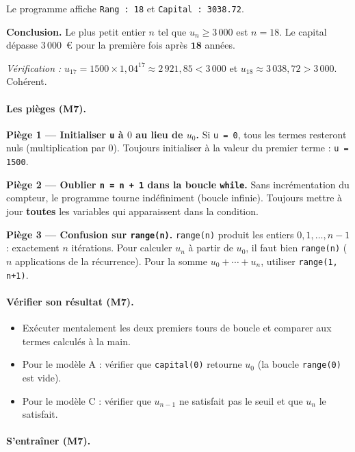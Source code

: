 

Le programme affiche \texttt{Rang : 18} et \texttt{Capital : 3038.72}.

\textbf{Conclusion.} Le plus petit entier $n$ tel que $u_n \geq 3\,000$ est $n = 18$. Le capital d\'epasse $3\,000$~\euro{} pour la premi\`ere fois apr\`es $\mathbf{18}$ ann\'ees.

\medskip
\textit{V\'erification :} $u_{17} = 1500 \times 1{,}04^{17} \approx 2\,921{,}85 < 3\,000$ et $u_{18} \approx 3\,038{,}72 > 3\,000$. Coh\'erent.

\paragraph{Les pi\`eges (M7).}

\textbf{Pi\`ege 1 --- Initialiser \texttt{u} \`a $0$ au lieu de $u_0$.}
Si \texttt{u = 0}, tous les termes resteront nuls (multiplication par $0$). Toujours initialiser \`a la valeur du premier terme : \texttt{u = 1500}.

\medskip
\textbf{Pi\`ege 2 --- Oublier \texttt{n = n + 1} dans la boucle \texttt{while}.}
Sans incr\'ementation du compteur, le programme tourne ind\'efiniment (boucle infinie). Toujours mettre \`a jour \textbf{toutes} les variables qui apparaissent dans la condition.

\medskip
\textbf{Pi\`ege 3 --- Confusion sur \texttt{range(n)}.}
\texttt{range(n)} produit les entiers $0, 1, \ldots, n-1$ : exactement $n$ it\'erations. Pour calculer $u_n$ \`a partir de $u_0$, il faut bien \texttt{range(n)} ($n$ applications de la r\'ecurrence). Pour la somme $u_0 + \cdots + u_n$, utiliser \texttt{range(1, n+1)}.

\paragraph{V\'erifier son r\'esultat (M7).}
\begin{itemize}
  \item Ex\'ecuter mentalement les deux premiers tours de boucle et comparer aux termes calcul\'es \`a la main.
  \item Pour le mod\`ele A : v\'erifier que \texttt{capital(0)} retourne $u_0$ (la boucle \texttt{range(0)} est vide).
  \item Pour le mod\`ele C : v\'erifier que $u_{n-1}$ ne satisfait pas le seuil et que $u_n$ le satisfait.
\end{itemize}

\paragraph{S'entra\^iner (M7).} 

